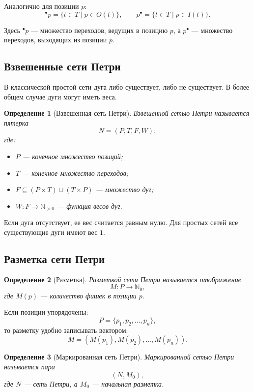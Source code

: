 \documentclass[12pt,a4paper]{article}
\newtheorem{definition}{Определение}
\begin{document}
Аналогично для позиции $p$:
\[
{}^\bullet p = \{t \in T \mid p \in O(t)\},
\qquad
p^\bullet = \{t \in T \mid p \in I(t)\}.
\]

Здесь ${}^\bullet p$ --- множество переходов, ведущих в позицию $p$, а $p^\bullet$ --- множество переходов, выходящих из позиции $p$.

\subsection{Взвешенные сети Петри}

В классической простой сети дуга либо существует, либо не существует. В более общем случае дуги могут иметь веса.

\begin{definition}[Взвешенная сеть Петри]
Взвешенной сетью Петри называется пятерка
\[
N = (P,T,F,W),
\]
где:
\begin{itemize}
    \item $P$ --- конечное множество позиций;
    \item $T$ --- конечное множество переходов;
    \item $F \subseteq (P \times T) \cup (T \times P)$ --- множество дуг;
    \item $W : F \to \mathbb{N}_{>0}$ --- функция весов дуг.
\end{itemize}
\end{definition}

Если дуга отсутствует, ее вес считается равным нулю. Для простых сетей все существующие дуги имеют вес $1$.

\subsection{Разметка сети Петри}

\begin{definition}[Разметка]
Разметкой сети Петри называется отображение
\[
M : P \to \mathbb{N}_0,
\]
где $M(p)$ --- количество фишек в позиции $p$.
\end{definition}

Если позиции упорядочены:
\[
P = \{p_1,p_2,\dots,p_n\},
\]
то разметку удобно записывать вектором:
\[
M = (M(p_1),M(p_2),\dots,M(p_n)).
\]

\begin{definition}[Маркированная сеть Петри]
Маркированной сетью Петри называется пара
\[
(N,M_0),
\]
где $N$ --- сеть Петри, а $M_0$ --- начальная разметка.
\end{definition}
\end{document}

